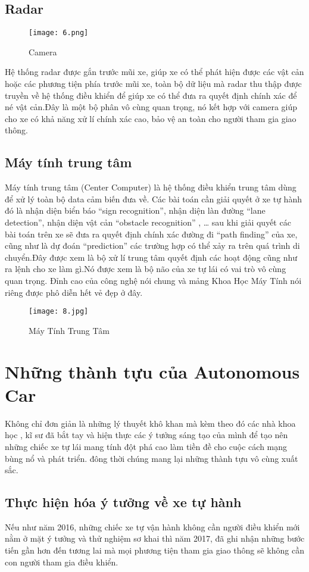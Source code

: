 \documentclass[18pt]{article}
\begin{document}
\subsection{Radar\cite{link}}
\begin{figure}[h]
\centering 
\texttt{[image: 6.png]} 
\caption{Camera} 
\label{dinhnghia} 
\end{figure}
Hệ thống radar được gắn trước mũi xe, giúp xe có thể phát hiện được các vật cản hoặc các phương tiện phía trước mũi xe, toàn bộ dữ liệu mà radar thu thập được truyền về hệ thống điều khiển để giúp xe có thể đưa ra quyết định chính xác để né vật cản.Đây là một bộ phân vô cùng quan trọng, nó kết hợp với camera giúp cho xe có khả năng xử lí chính xác cao, bảo vệ an toàn cho người tham gia giao thông.\newpage

\subsection{Máy tính trung tâm}
Máy tính trung tâm (Center Computer) là hệ thống điều khiển trung tâm dùng để xử lý toàn bộ data cảm biến  đưa về. Các bài toán cần giải quyết ở xe tự hành đó là nhận diện biển báo “sign recognition”, nhận diện làn đường “lane detection”, nhận diện vật cản “obstacle recognition” , … sau khi giải quyết các bài toán trên xe sẽ đưa ra quyết định chính xác đường đi “path finding” của xe, cũng như là dự đoán “prediction” các trường hợp có thể xảy ra trên quá trình di chuyển.Đây được xem là bộ xử lí trung tâm quyết định các hoạt động cũng như ra lệnh cho xe làm gì.Nó được xem là bộ não của xe tự lái có vai trò vô cùng quan trọng. Đỉnh cao của công nghệ nói chung và mảng Khoa Học Máy Tính nói riêng được phô diễn hết vẻ đẹp ở đây.
\begin{figure}[h]
\centering 
\texttt{[image: 8.jpg]} 
\caption{Máy Tính Trung Tâm} 
\label{dinhnghia} 
\end{figure}\newpage
\section{Những thành tựu của Autonomous Car}
Không chỉ đơn giản là những lý thuyết khô khan mà kèm theo đó các nhà khoa học , kĩ sư đã bắt tay và hiện thực các ý tưởng sáng tạo của mình để tạo nên những chiếc xe tự lái mang tính đột phá cao làm tiền đề cho cuộc cách mạng bùng nổ và phát triển. đông thời chúng mang lại những thành tựu vô cùng xuất sắc.
\subsection{Thực hiện hóa ý tưởng về xe tự hành}
Nếu như năm 2016, những chiếc xe tự vận hành không cần người điều khiển mới nằm ở mặt ý tưởng và thử nghiệm sơ khai thì năm 2017, đã ghi nhận những bước tiến gần hơn đến tương lai mà mọi phương tiện tham gia giao thông sẽ không cần con người tham gia điều khiển.
\end{document}
